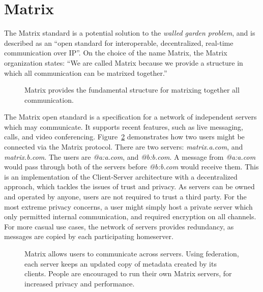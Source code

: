 \section{Matrix}
The Matrix standard is a potential solution to the \textit{walled garden problem}, and is described as an ``open standard for interoperable, decentralized, real-time communication over IP''\cite{matrix_org}.
On the choice of the name Matrix, the Matrix organization states: ``We are called Matrix because we provide a structure in which all communication can be matrixed together.''\cite{matrix_org_faq}

\begin{figure}
	\centering
	\caption{
		Matrix provides the fundamental structure for matrixing together all communication.
	}\label{fig:matrixing_together}
\end{figure}

The Matrix open standard\cite{matrix_org_spec} is a specification for a network of independent servers which may communicate.
It supports recent features, such as live messaging, calls, and video conferencing.
Figure~\ref{fig:matrix_structure} demonstrates how two users might be connected via the Matrix protocol.
There are two servers: \textit{matrix.a.com}, and \textit{matrix.b.com}.
The users are \textit{@a:a.com}, and \textit{@b:b.com}.
A message from \textit{@a:a.com} would pass through both of the servers before \textit{@b:b.com} would receive them.
This is an implementation of the Client-Server architecture with a decentralized approach, which tackles the issues of trust and privacy.
As servers can be owned and operated by anyone, users are not required to trust a third party.
For the most extreme privacy concerns, a user might simply host a private server which only permitted internal communication, and required encryption on all channels.
For more casual use cases, the network of servers provides redundancy, as messages are copied by each participating homeserver.

\begin{figure}
	\centering
	\resizebox{!}{!}{}
	\caption{
		Matrix allows users to communicate across servers.
		Using federation, each server keeps an updated copy of metadata created by its clients.
		People are encouraged to run their own Matrix servers, for increased privacy and performance.
	}\label{fig:matrix_structure}
\end{figure}


